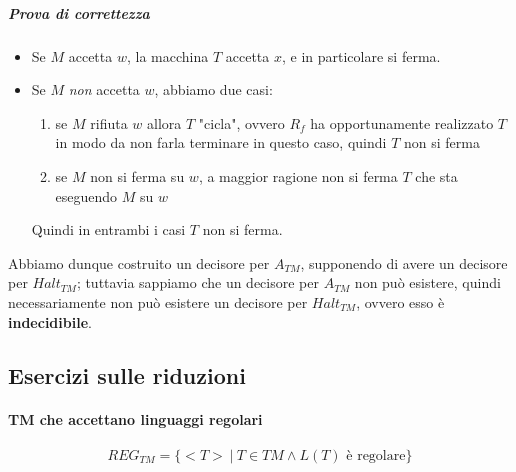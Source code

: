 \subparagraph{Prova di correttezza}
\begin{itemize}
\item Se $M$ accetta $w$, la macchina $T$ accetta $x$, e in particolare si ferma.

\item Se $M$ \textit{non} accetta $w$, abbiamo due casi:
\begin{enumerate}
\item se $M$ rifiuta $w$ allora $T$ "cicla", ovvero $R_f$ ha opportunamente realizzato $T$ in modo da non farla terminare in questo caso, quindi $T$ non si ferma

\item se $M$ non si ferma su $w$, a maggior ragione non si ferma $T$ che sta eseguendo $M$ su $w$
\end{enumerate}
Quindi in entrambi i casi $T$ non si ferma.
\end{itemize}
Abbiamo dunque costruito un decisore per $A_{TM}$, supponendo di avere un decisore per $Halt_{TM}$; tuttavia sappiamo che un decisore per $A_{TM}$ non può esistere, quindi necessariamente non può esistere un decisore per $Halt_{TM}$, ovvero esso è \textbf{indecidibile}.

\subsection{Esercizi sulle riduzioni}

\paragraph{TM che accettano linguaggi regolari}

\[
	REG_{TM} = \{ <T>\ | \ T \in TM \land L(T) \text{ è regolare} \}
\]

